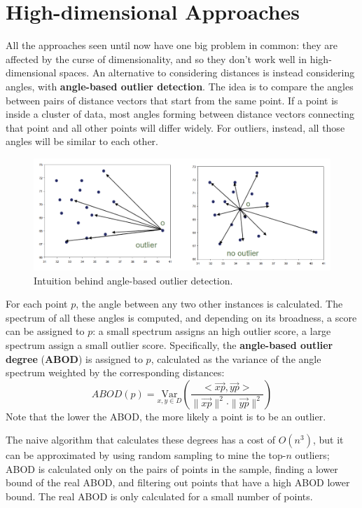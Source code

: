 \section{High-dimensional Approaches}

All the approaches seen until now have one big problem in common: they are affected by the curse of dimensionality, and so they don't work well in high-dimensional spaces. An alternative to considering distances is instead considering angles, with \textbf{angle-based outlier detection}. The idea is to compare the angles between pairs of distance vectors that start from the same point. If a point is inside a cluster of data, most angles forming between distance vectors connecting that point and all other points will differ widely. For outliers, instead, all those angles will be similar to each other.
\begin{figure}[h]
    \centering
    \includegraphics[width=0.7\linewidth]{img/angle_based_od.png}
    \caption{Intuition behind angle-based outlier detection.}
    \label{fig:angle-based}
\end{figure}
For each point $p$, the angle between any two other instances is calculated. The spectrum of all these angles is computed, and depending on its broadness, a score can be assigned to $p$: a small spectrum assigns an high outlier score, a large spectrum assign a small outlier score. Specifically, the \textbf{angle-based outlier degree} (\textbf{ABOD}) is assigned to $p$, calculated as the variance of the angle spectrum weighted by the corresponding distances:
\begin{equation*}
    \textit{ABOD}(p) = \underset{x,y \in D}{\mathrm{Var}} \left ( \dfrac{< \vec{xp}, \vec{yp} >}{\|\vec{xp}\|^2 \cdot \|\vec{yp}\|^2}  \right )
\end{equation*}
Note that the lower the ABOD, the more likely a point is to be an outlier.

The naive algorithm that calculates these degrees has a cost of $O(n^3)$, but it can be approximated by using random sampling to mine the top-$n$ outliers; ABOD is calculated only on the pairs of points in the sample, finding a lower bound of the real ABOD, and filtering out points that have a high ABOD lower bound. The real ABOD is only calculated for a small number of points.

